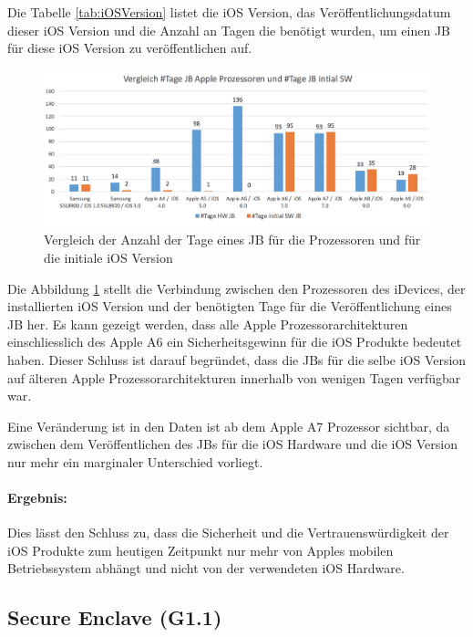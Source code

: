 Die Tabelle \ref{tab:iOSVersion} listet die iOS Version, das Veröffentlichungsdatum dieser iOS Version und die Anzahl an Tagen die benötigt wurden, um einen JB für diese iOS Version zu veröffentlichen auf.  \par 
\begin{figure}[htbp]
        \centering
                \includegraphics[scale=0.55]{Bilder/iDeviceJB-SW-HW.png}
         \caption{Vergleich der Anzahl der Tage eines JB für die Prozessoren und für die initiale iOS Version}
        \label{fig:VergleichJBProzessorSW}      
\end{figure}
Die Abbildung \ref{fig:VergleichJBProzessorSW} stellt die Verbindung zwischen den Prozessoren des iDevices, der installierten iOS Version und der benötigten Tage für die Veröffentlichung eines JB her. Es kann gezeigt werden, dass alle Apple Prozessorarchitekturen einschliesslich des Apple A6 ein Sicherheitsgewinn für die iOS Produkte bedeutet haben. Dieser Schluss ist darauf begründet, dass die JBs für die selbe iOS Version auf älteren Apple Prozessorarchitekturen innerhalb von wenigen Tagen verfügbar war. \par 
Eine Veränderung ist in den Daten ist ab dem Apple A7 Prozessor sichtbar, da zwischen dem Veröffentlichen des JBs für die iOS Hardware und die iOS Version nur mehr ein marginaler Unterschied vorliegt.
\paragraph{Ergebnis:} Dies lässt den Schluss zu, dass die Sicherheit und die Vertrauenswürdigkeit der iOS Produkte zum heutigen Zeitpunkt nur mehr von Apples mobilen Betriebssystem abhängt und nicht von der verwendeten iOS Hardware. 
%
\subsection{Secure Enclave  (G1.1)}
\label{sec:Frage1SecureEnclave}
 
